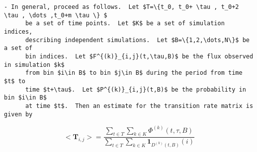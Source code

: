 \documentclass[10pt]{article}
\newcommand{\matr}[1]{\mathbf{#1}}
\begin{document}
\begin{Verbatim}[commandchars=\\\{\},codes={\catcode`$=3\catcode`^=7\catcode`_=8}]
    - In general, proceed as follows.  Let $T=\{t_0, t_0+ \tau , t_0+2 \tau , \dots ,t_0+m \tau \} $ 
      be a set of time points.  Let $K$ be a set of simulation indices,
      describing independent simulations.  Let $B=\{1,2,\dots,N\}$ be a set of
      bin indices.  Let $F^{(k)}_{i,j}(t,\tau,B)$ be the flux observed in simulation $k$
      from bin $i\in B$ to bin $j\in B$ during the period from time $t$ to 
      time $t+\tau$.  Let $P^{(k)}_{i,j}(t,B)$ be the probability in bin $i\in B$
      at time $t$.  Then an estimate for the transition rate matrix is given by

\end{Verbatim}

\[<\matr{T}_{i,j}> = \frac{\sum_{t\in T}\sum_{k\in K} \Phi^{(k)}(t,\tau,B)}{\sum_{t\in T}\sum_{k\in K} \mathbf{1}_{D^{(k)}(t,B)}(i)} \]
              
\begin{Verbatim}[commandchars=\\\{\},codes={\catcode`$=3\catcode`^=7\catcode`_=8}]



\end{Verbatim}
\end{document}
